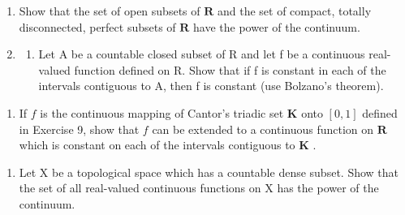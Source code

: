 \begin{enumerate}
\def\labelenumi{\arabic{enumi})}
\setcounter{enumi}{14}
\item
  Show that the set of open subsets of \(\mathbf{R}\) and the set of compact, totally disconnected, perfect subsets of \(\mathbf{R}\) have the power of the continuum.
\item
  \begin{enumerate}
  \def\labelenumii{\alph{enumii})}
  \tightlist
  \item
    Let A be a countable closed subset of R and let f be a continuous real-valued function defined on R. Show that if f is constant in each of the intervals contiguous to A, then f is constant (use Bolzano's theorem).
  \end{enumerate}
\end{enumerate}

\begin{enumerate}
\def\labelenumi{\alph{enumi})}
\setcounter{enumi}{1}
\tightlist
\item
  If \(f\) is the continuous mapping of Cantor's triadic set \(\mathbf{K}\) onto \([0, 1]\) defined in Exercise 9, show that \(f\) can be extended to a continuous function on \(\mathbf{R}\) which is constant on each of the intervals contiguous to \(\mathbf{K}\) .
\end{enumerate}

\begin{enumerate}
\def\labelenumi{\arabic{enumi})}
\setcounter{enumi}{16}
\tightlist
\item
  Let X be a topological space which has a countable dense subset. Show that the set of all real-valued continuous functions on X has the power of the continuum.
\end{enumerate}
\relax{}
